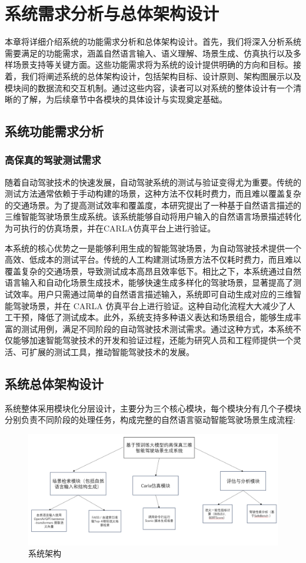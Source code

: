 \chapter{系统需求分析与总体架构设计}
本章将详细介绍系统的功能需求分析和总体架构设计。首先，我们将深入分析系统需要满足的功能需求，涵盖自然语言输入、语义理解、场景生成、仿真执行以及多样场景支持等关键方面。这些功能需求将为系统的设计提供明确的方向和目标。接着，我们将阐述系统的总体架构设计，包括架构目标、设计原则、架构图展示以及模块间的数据流和交互机制。通过这些内容，读者可以对系统的整体设计有一个清晰的了解，为后续章节中各模块的具体设计与实现奠定基础。
\section{系统功能需求分析}
\subsection{高保真的驾驶测试需求}
随着自动驾驶技术的快速发展，自动驾驶系统的测试与验证变得尤为重要。传统的测试方法通常依赖于手动构建的场景，这种方法不仅耗时费力，而且难以覆盖复杂的交通场景。为了提高测试效率和覆盖度，本研究提出了一种基于自然语言描述的三维智能驾驶场景生成系统。该系统能够自动将用户输入的自然语言场景描述转化为可执行的仿真场景，并在CARLA仿真平台上进行验证。

本系统的核心优势之一是能够利用生成的智能驾驶场景，为自动驾驶技术提供一个高效、低成本的测试平台。传统的人工构建测试场景方法不仅耗时费力，而且难以覆盖复杂的交通场景，导致测试成本高昂且效率低下。相比之下，本系统通过自然语言输入和自动化场景生成技术，能够快速生成多样化的驾驶场景，显著提高了测试效率。用户只需通过简单的自然语言描述输入，系统即可自动生成对应的三维智能驾驶场景，并在 CARLA 仿真平台上进行验证。这种自动化流程大大减少了人工干预，降低了测试成本。此外，系统支持多种语义表达和场景组合，能够生成丰富的测试用例，满足不同阶段的自动驾驶技术测试需求。通过这种方式，本系统不仅能够加速智能驾驶技术的开发和验证过程，还能为研究人员和工程师提供一个灵活、可扩展的测试工具，推动智能驾驶技术的发展。


\section{系统总体架构设计}
系统整体采用模块化分层设计，主要分为三个核心模块，每个模块分有几个子模块分别负责不同阶段的处理任务，构成完整的自然语言驱动智能驾驶场景生成流程:
\begin{figure}[H]
	\centering
	\includegraphics[width=1.0\textwidth]{images/系统架构图.pdf}
	\caption{系统架构}
	\label{fig:system-architecture}
\end{figure}
